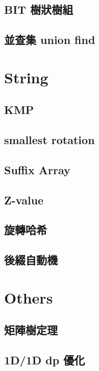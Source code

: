 \subsection{BIT 樹狀樹組}

\subsection{並查集 union find}




\section{String}

\subsection{KMP}

\subsection{smallest rotation}

\subsection{Suffix Array}

\subsection{Z-value}

\subsection{旋轉哈希}

\subsection{後綴自動機}


\section{Others}

\subsection{矩陣樹定理}

\subsection{1D/1D dp 優化}

